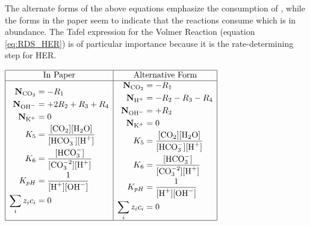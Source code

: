 \documentclass[12pt]{article}
\newcommand{\flux}{\mathrm{\mathbf{N}}}
\begin{document}
  The alternate forms of the above equations emphasize the consumption of , while the forms in the paper seem to indicate that the reactions consume  which is in abundance. The Tafel expression for the Volmer Reaction (equation \ref{eq:RDS_HER}) is of particular importance because it is the rate-determining step for HER.

  \begin{table}[h]
	\setcellgapes{5pt}
	\makegapedcells
	\centering
		\begingroup
		\addtolength{\jot}{0.5em}
		$\begin{array}{ | c | c | }
		\hline
		\text{In Paper} & \text{Alternative Form}
		\\
		\hline
			\multicolumn{1}{| c |}{ %
				\begin{aligned}
          \flux_{\text{CO}_2} &= - R_1 \\
          \flux_{\text{OH}^-} &= +2R_2 + R_3 + R_4 \\
          \flux_{\text{K}^+} &= 0 \\
          K_5 &= \frac{[\text{CO}_2] [\text{H}_2\text{O}]}{[\text{HCO}_3^-] [\text{H}^+]} \\
          K_6 &= \frac{[\text{HCO}_3^-]}{[\text{CO}_3^{-2}] [\text{H}^+]} \\
          K_{pH} &= \frac{1}{[\text{H}^+] [\text{OH}^-]} \\
          \sum_i z_i c_i &= 0
					\\
				\end{aligned}
			}
		&
			\multicolumn{1}{c |}{ %
				\begin{aligned}
          \flux_{\text{CO}_2} &= - R_1 \\
          \flux_{\text{H}^+} &= - R_2 - R_3 - R_4 \\
          \flux_{\text{OH}^-} &= +R_2 \\
          \flux_{\text{K}^+} &= 0 \\
          K_5 &= \frac{[\text{CO}_2] [\text{H}_2\text{O}]}{[\text{HCO}_3^-] [\text{H}^+]} \\
          K_6 &= \frac{[\text{HCO}_3^-]}{[\text{CO}_3^{-2}] [\text{H}^+]} \\
          K_{pH} &= \frac{1}{[\text{H}^+] [\text{OH}^-]} \\
          \sum_i z_i c_i &= 0
          \\
				\end{aligned}
			}

		\\
		\hline

		\end{array}$
		\endgroup
	\end{table}
\end{document}
